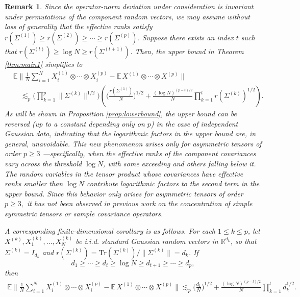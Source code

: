 \documentclass[numbers,webpdf,imaiai]{ima-authoring-template}
\theoremstyle{thmstyletwo}%
\newtheorem{remark}{Remark}%
\numberwithin{equation}{section}
\numberwithin{equation}{section}
\providecommand{\mathbbm}{\mathbb} %
\newcommand{\R}{\mathbbm{R}}
\newcommand{\E}{\mathbb{E}}
\begin{document}
\begin{remark}
Since the operator-norm deviation under consideration is invariant under permutations of the component random vectors, we may assume without loss of generality that the effective ranks satisfy $r(\Sigma^{(1)})\ge r(\Sigma^{(2)})\ge \cdots\ge r(\Sigma^{(p)})$. Suppose there exists an index $t$ such that $r(\Sigma^{(t)}) \ge \log N \ge r(\Sigma^{(t+1)})$. Then, the upper bound in Theorem \ref{thm:main1} simplifies to
\begin{align*}
&\mathbb{E} \bigg\| \frac{1}{N} \sum_{i=1}^N X_i^{(1)} \otimes \cdots \otimes X_i^{(p)}
- \mathbb{E}\, X^{(1)} \otimes \cdots \otimes X^{(p)} \bigg\| \\
&\quad \lesssim_p 
\bigg( \prod_{k=1}^p \|\Sigma^{(k)}\|^{1/2} \bigg)
\left( \bigg( \frac{r(\Sigma^{(1)})}{N} \bigg)^{1/2}
+ \frac{(\log N)^{(p-t)/2}}{N} \prod_{k=1}^{t} r(\Sigma^{(k)})^{1/2} \right).
\end{align*}
As will be shown in Proposition \ref{prop:lowerbound},  the upper bound can be reversed (up to a constant depending only on $p$) in the case of independent Gaussian data,  indicating that the logarithmic factors in the upper bound are, in general, unavoidable. This new phenomenon arises only for asymmetric tensors of order $p\ge 3$ ---specifically, when the effective ranks of the component covariances vary across the threshold $\log N$, with some exceeding and others falling below it. The random variables in the tensor product whose covariances have effective ranks smaller than $\log N$ contribute logarithmic factors to the second term in the upper bound. 
Since this behavior only arises for asymmetric tensors of order $p \ge 3,$
it has not been observed in previous work on the concentration of simple symmetric tensors or sample covariance operators.

A corresponding finite-dimensional corollary is as follows. For each $1\le k\le p$, let $X^{(k)}, X_1^{(k)}, \ldots, X_N^{(k)} $ be i.i.d. standard Gaussian random vectors in $\R^{d_k}$, so that $\Sigma^{(k)}=I_{d_k}$ and $r(\Sigma^{(k)})=\mathrm{Tr}(\Sigma^{(k)})/\|\Sigma^{(k)}\|=d_k$. If 
\[d_1\ge \cdots \ge d_t \ge \log N \ge d_{t+1} \ge \cdots \ge d_p,
\] 
then
\begin{align*}
\E \bigg\|\frac{1}{N} \sum_{i=1}^N X_i^{(1)} \otimes \cdots \otimes X_i^{(p)}-\E\, X^{(1)} \otimes \cdots \otimes X^{(p)}\bigg\| \lesssim_p  \bigg(\frac{d_1}{N}\bigg)^{1/2}+\frac{(\log N)^{(p-t)/2}}{N}\prod_{k=1}^{t}d_k^{1/2}.
\end{align*}
\end{remark}
\end{document}

